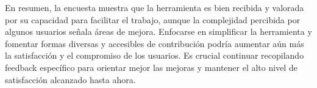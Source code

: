 En resumen, la encuesta muestra que la herramienta es bien recibida y 
valorada por su capacidad para facilitar el trabajo, aunque la complejidad 
percibida por algunos usuarios señala áreas de mejora. Enfocarse en simplificar 
la herramienta y fomentar formas diversas y accesibles de contribución podría 
aumentar aún más la satisfacción y el compromiso de los usuarios. Es crucial 
continuar recopilando feedback específico para orientar mejor las mejoras y 
mantener el alto nivel de satisfacción alcanzado hasta ahora.